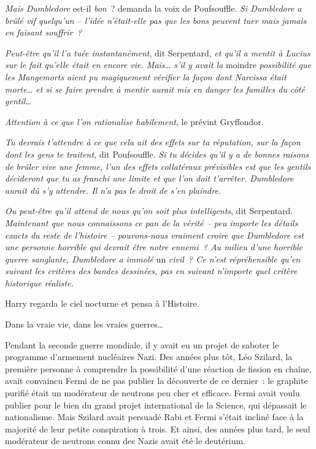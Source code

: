 \emph{Mais Dumbledore} est-il \emph{bon}~? demanda la voix de Poufsouffle. \emph{Si Dumbledore a brûlé vif quelqu'un -- l'idée n'était-elle pas que les bons peuvent tuer mais jamais en faisant souffrir~?}

\emph{Peut-être qu'il l'a tuée instantanément}, dit Serpentard, \emph{et qu'il a mentit à Lucius sur le fait qu'elle était en encore vie. Mais… s'il y avait la} moindre \emph{possibilité que les Mangemorts aient pu magiquement vérifier la façon dont Narcissa était morte… et si se faire prendre à mentir aurait mis en danger les familles du côté gentil…}

\emph{Attention à ce que l'on rationalise habilement}, le prévint Gryffondor.

\emph{Tu devrais t'attendre à ce que cela ait des effets sur ta réputation, sur la façon dont les gens te traitent}, dit Poufsouffle. \emph{Si tu décides qu'il y a de bonnes raisons de brûler vive une femme, l'un des effets collatéraux prévisibles est que les gentils décideront que tu as franchi une limite et que l'on doit t'arrêter. Dumbledore aurait dû s'y attendre. Il n'a pas le droit de s'en plaindre.}

\emph{Ou peut-être qu'il attend de nous qu'on soit plus intelligents}, dit Serpentard. \emph{Maintenant que nous connaissons ce pan de la vérité -- peu importe les détails exacts du reste de l'histoire -- pouvons-nous vraiment croire que Dumbledore est une personne horrible qui devrait être notre ennemi~? Au milieu d'une horrible guerre sanglante, Dumbledore a immolé} un \emph{civil~? Ce n'est répréhensible qu'en suivant les critères des bandes dessinées, pas en suivant n'importe quel critère historique réaliste.}

Harry regarda le ciel nocturne et pensa à l'Histoire.

Dans la vraie vie, dans les vraies guerres…

Pendant la seconde guerre mondiale, il y avait eu un projet de saboter le programme d'armement nucléaires Nazi. Des années plus tôt, Léo Szilard, la première personne à comprendre la possibilité d'une réaction de fission en chaîne, avait convaincu Fermi de ne pas publier la découverte de ce dernier~: le graphite purifié était un modérateur de neutrons peu cher et efficace. Fermi avait voulu publier pour le bien du grand projet international de la Science, qui dépassait le nationalisme. Mais Szilard avait persuadé Rabi et Fermi s'était incliné face à la majorité de leur petite conspiration à trois. Et ainsi, des années plus tard, le seul modérateur de neutrons connu des Nazis avait été le deutérium.

